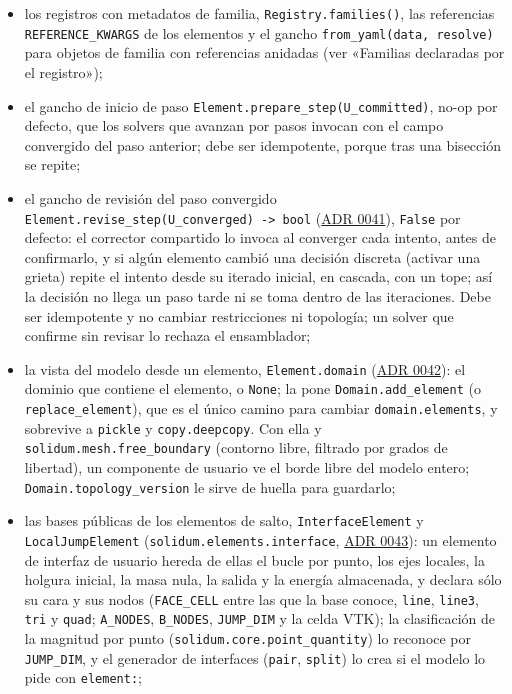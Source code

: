 \documentclass[11pt,oneside]{report}
\begin{document}
\begin{itemize}
  \item los registros con metadatos de familia, \texttt{Registry.\allowbreak{}families()}, las referencias \texttt{REFERENCE\_KWARGS} de los elementos y el gancho \texttt{from\_\allowbreak{}yaml(data, resolve)} para objetos de familia con referencias anidadas (ver «Familias declaradas por el registro»);
  \item el gancho de inicio de paso \texttt{Element.\allowbreak{}prepare\_\allowbreak{}step(U\_\allowbreak{}committed)}, no-op por defecto, que los solvers que avanzan por pasos invocan con el campo convergido del paso anterior; debe ser idempotente, porque tras una bisección se repite;
  \item el gancho de revisión del paso convergido \texttt{Element.\allowbreak{}revise\_\allowbreak{}step(U\_\allowbreak{}converged) -\textgreater{} bool} (\hyperref[adr:0041]{ADR 0041}), \texttt{False} por defecto: el corrector compartido lo invoca al converger cada intento, antes de confirmarlo, y si algún elemento cambió una decisión discreta (activar una grieta) repite el intento desde su iterado inicial, en cascada, con un tope; así la decisión no llega un paso tarde ni se toma dentro de las iteraciones. Debe ser idempotente y no cambiar restricciones ni topología; un solver que confirme sin revisar lo rechaza el ensamblador;
  \item la vista del modelo desde un elemento, \texttt{Element.domain} (\hyperref[adr:0042]{ADR 0042}): el dominio que contiene el elemento, o \texttt{None}; la pone \texttt{Domain.\allowbreak{}add\_\allowbreak{}element} (o \texttt{replace\_element}), que es el único camino para cambiar \texttt{domain.elements}, y sobrevive a \texttt{pickle} y \texttt{copy.deepcopy}. Con ella y \texttt{solidum.\allowbreak{}mesh.\allowbreak{}free\_\allowbreak{}boundary} (contorno libre, filtrado por grados de libertad), un componente de usuario ve el borde libre del modelo entero; \texttt{Domain.\allowbreak{}topology\_\allowbreak{}version} le sirve de huella para guardarlo;
  \item las bases públicas de los elementos de salto, \texttt{InterfaceElement} y \texttt{LocalJumpElement} (\texttt{solidum.\allowbreak{}elements.\allowbreak{}interface}, \hyperref[adr:0043]{ADR 0043}): un elemento de interfaz de usuario hereda de ellas el bucle por punto, los ejes locales, la holgura inicial, la masa nula, la salida y la energía almacenada, y declara sólo su cara y sus nodos (\texttt{FACE\_CELL} entre las que la base conoce, \texttt{line}, \texttt{line3}, \texttt{tri} y \texttt{quad}; \texttt{A\_NODES}, \texttt{B\_NODES}, \texttt{JUMP\_DIM} y la celda VTK); la clasificación de la magnitud por punto (\texttt{solidum.\allowbreak{}core.\allowbreak{}point\_\allowbreak{}quantity}) lo reconoce por \texttt{JUMP\_DIM}, y el generador de interfaces (\texttt{pair}, \texttt{split}) lo crea si el modelo lo pide con \texttt{element:};

\end{itemize}
\end{document}
